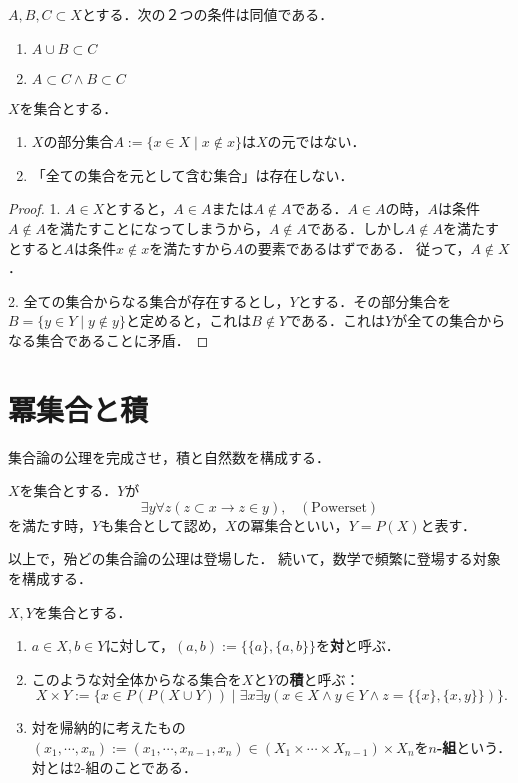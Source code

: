 \documentclass[uplatex, 12pt, dvipdfmx]{jsreport}
\begin{document}
\begin{proposition}$A,B,C\subset X$とする．次の２つの条件は同値である．
    \begin{enumerate}
        \item $A\cup B\subset C$
        \item $A\subset C\wedge B\subset C$
    \end{enumerate}
\end{proposition}

\begin{proposition}[Russellの逆理]
    $X$を集合とする．
    \begin{enumerate}
        \item $X$の部分集合$A:=\{x\in X\mid x\notin x\}$は$X$の元ではない．
        \item 「全ての集合を元として含む集合」は存在しない．
    \end{enumerate}
\end{proposition}
\begin{proof}
    1. $A\in X$とすると，$A\in A$または$A\notin A$である．$A\in A$の時，$A$は条件$A\notin A$を満たすことになってしまうから，$A\notin A$である．しかし$A\notin A$を満たすとすると$A$は条件$x\notin x$を満たすから$A$の要素であるはずである．
    従って，$A\notin X$．

    2. 全ての集合からなる集合が存在するとし，$Y$とする．その部分集合を$B=\{y\in Y\mid y\notin y\}$と定めると，これは$B\notin Y$である．これは$Y$が全ての集合からなる集合であることに矛盾．
\end{proof}

\section{冪集合と積}

\begin{screen}
    集合論の公理を完成させ，積と自然数を構成する．
\end{screen}

\begin{axiom}[冪集合]
    $X$を集合とする．$Y$が
    \[\exists y\forall z(z\subset x\rightarrow z\in y),\;\;\;(\mathrm{Power set})\]
    を満たす時，$Y$も集合として認め，$X$の冪集合といい，$Y=P(X)$と表す．
\end{axiom}

以上で，殆どの集合論の公理は登場した．
続いて，数学で頻繁に登場する対象を構成する．

\begin{definition}[積]
    $X,Y$を集合とする．
    \begin{enumerate}
        \item $a\in X,b\in Y$に対して，$(a,b):=\{\{a\},\{a,b\}\}$を\textbf{対}と呼ぶ．
        \item このような対全体からなる集合を$X$と$Y$の\textbf{積}と呼ぶ：
        \[ X\times Y:=\{x\in P(P(X\cup Y))\mid \exists x\exists y(x\in X\land y\in Y\land z=\{\{x\},\{x,y\}\})\}. \]
        \item 対を帰納的に考えたもの$(x_1,\cdots,x_n):=(x_1,\cdots,x_{n-1},x_n)\in( X_1\times\cdots\times X_{n-1})\times X_n$を\textbf{$n$-組}という．対とは2-組のことである．
    \end{enumerate}
\end{definition}
\end{document}

